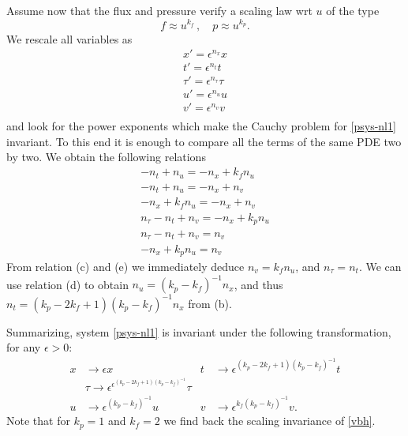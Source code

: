 \documentclass{article}
\theoremstyle{plain}
\theoremstyle{definition}
\numberwithin{theorem}{section}
\begin{document}
Assume now that the flux and pressure verify a scaling law wrt $u$ of the type 
$$
f  \approx u^{k_f}\,,\quad p \approx u^{k_p}.
$$
We rescale all variables as 
$$
\begin{aligned}
x'  = \epsilon^{n_x} x\\
t'  = \epsilon^{n_t} t\\ 
\tau'  = \epsilon^{n_\tau} \tau\\
u'  = \epsilon^{n_u} u\\
v'  = \epsilon^{n_v} v\\
\end{aligned}
$$
and look for the power exponents which make the Cauchy problem  for \eqref{psys-nl1} invariant. To this end it is enough
to compare all the terms of the same PDE  two by two. We obtain the following relations
\begin{subequations}
\begin{align}
-n_t+n_u = -n_x +k_f n_u\\
-n_t+n_u=-n_x+ n_v\\
-n_x+k_f n_u = -n_x + n_v\\
n_\tau - n_t + n_v = - n_x + k_p n_u\\
n_\tau  - n_t + n_v = n_v\\
-n_x+k_p n_u= n_v
\end{align}
\end{subequations}
From relation (c) and  (e) we immediately deduce $n_v = k_f n_u$, and  $n_\tau=n_t$. We can use 
  relation (d)  to obtain $n_u=  (k_p - k_f)^{-1}n_x$, and thus $n_t =  (k_p - 2k_f  + 1) (k_p - k_f)^{-1} n_x$ from (b).
  
Summarizing,     system  \eqref{psys-nl1}  is invariant under the following transformation, for any $\epsilon>0$:
\begin{subequations}
\label{psys-scaling}
\begin{align}
   x & \to \epsilon x & t & \to \epsilon^{(k_p - 2k_f  + 1) (k_p - k_f)^{-1} } t \\
     &\tau  \to \epsilon^{\epsilon^{(k_p - 2k_f  + 1) (k_p - k_f)^{-1} }} \tau \\
    u & \to \epsilon^{(k_p - k_f)^{-1}} u & v & \to \epsilon^{k_f(k_p - k_f)^{-1}} v.
\end{align}
\end{subequations}
Note  that for $k_p=1$ and $k_f=2$ we find back the scaling invariance of  \eqref{vbh}.
\end{document}
